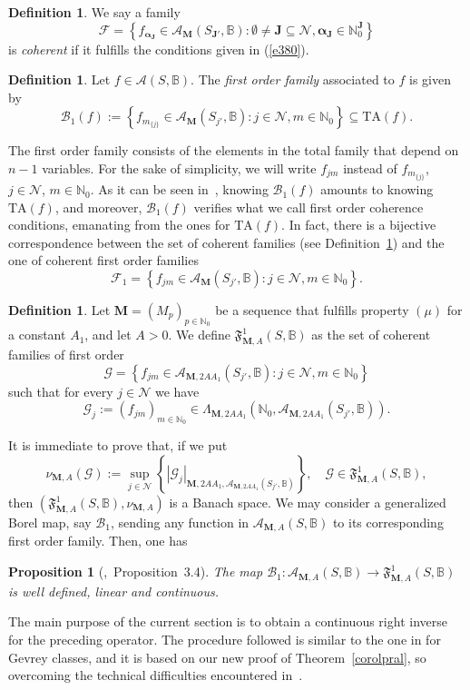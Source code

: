 \documentclass[11pt,a4paper,leqno]{article}
\theoremstyle{plain}
\newtheorem{prop}[theo]{Proposition}
\theoremstyle{definition}
\newtheorem{defin}[theo]{Definition}
\def\N{\mathbb{N}}
\def\balpha{\boldsymbol{\alpha}}
\def\bJ{\boldsymbol{J}}
\def\bM{\boldsymbol{M}}
\begin{document}
\begin{defin}\label{deffirst}
We say a family
$$\mathcal{F}=\left\{f_{\balpha_{\bJ}}\in\mathcal{A}_{\bM}(S_{\bJ'},\mathbb{B}):\emptyset\neq \bJ\subseteq\mathcal{N},\balpha_{\bJ}\in\N_{0}^{\bJ}\right\}$$
is \textit{coherent} if it fulfills the conditions given in (\ref{e380}).
\end{defin}
\begin{defin}
Let $f\in\mathcal{A}(S,\mathbb{B})$. The \textit{first order family} associated to $f$ is given by
$$\mathcal{B}_{1}(f):=\left\{f_{m_{\{j\}}}\in\mathcal{A}_{\bM}(S_{j'},\mathbb{B}): j\in\mathcal{N},m\in\N_{0}\right\}\subseteq \mathrm{TA}(f).$$
\end{defin}
The first order family consists of the elements in the total family that depend on $n-1$ variables. For the sake of simplicity, we will write $f_{jm}$ instead of $f_{m_{\{j\}}}$, $j\in\mathcal{N}$, $m\in\N_{0}$. As it can be seen in~\cite[Section 4]{galindosanz}, knowing $\mathcal{B}_{1}(f)$ amounts to knowing $\mathrm{TA}(f)$, and moreover, $\mathcal{B}_{1}(f)$ verifies what we call first order coherence conditions, emanating from the ones for $\mathrm{TA}(f)$.
In fact, there is a bijective correspondence between the set of coherent families (see Definition~\ref{deffirst}) and the one of coherent first order families
$$\mathcal{F}_{1}=\left\{f_{jm}\in\mathcal{A}_{\bM}(S_{j'},\mathbb{B}):j\in\mathcal{N},m\in\N_{0}\right\}.$$
\begin{defin}\label{defiFamiFirstOrder}
Let $\bM=(M_{p})_{p\in\N_0}$ be a sequence that fulfills property $(\mu)$ for a constant $A_1$, and let $A>0$. We define $\mathfrak{F}^1_{\bM,A}(S,\mathbb{B})$ as the set of coherent families of first order
$$\mathcal{G}=\left\{f_{jm}\in\mathcal{A}_{\bM,2AA_{1}}(S_{j'},\mathbb{B}):j\in\mathcal{N},m\in\N_{0}\right\}$$
such that for every $j\in\mathcal{N}$ we have
$$\mathcal{G}_{j}:=(f_{jm})_{m\in\N_0}\in \Lambda_{\bM,2AA_1}\left(\N_0,\mathcal{A}_{\bM,2AA_1}(S_{j'},\mathbb{B})\right).$$
\end{defin}
It is immediate to prove that, if we put
$$\nu_{\bM,A}(\mathcal{G}):= \sup_{j\in\mathcal{N}}\left\{ |\mathcal{G}_{j}|_{\bM,2AA_1,\mathcal{A}_{\bM,2AA_1}(S_{j'},\mathbb{B})}\right\}, \quad\mathcal{G}\in\mathfrak{F}_{\bM,A}^1(S,\mathbb{B}),$$
then $(\mathfrak{F}_{\bM,A}^1(S,\mathbb{B}),\nu_{\bM,A})$ is a Banach space.
We may consider a generalized Borel map, say $\mathcal{B}_{1}$, sending any function in $\mathcal{A}_{\bM,A}(S,\mathbb{B})$ to its corresponding first order family. Then, one has
\begin{prop}[\cite{lastrasanz},\ Proposition~3.4]\label{propBunowelldefined}
The map
$\mathcal{B}_{1}:\mathcal{A}_{\bM,A}(S,\mathbb{B})\to \mathfrak{F}_{\bM,A}^{1}(S,\mathbb{B})$
is well defined, linear and continuous.
\end{prop}
The main purpose of the current section is to obtain a continuous right inverse for the preceding operator. The procedure followed is similar to the one in \cite{javier} for Gevrey classes, and it is based on our new proof of Theorem~\ref{corolpral}, so overcoming the technical difficulties encountered in~\cite{lastrasanz}.
\end{document}

